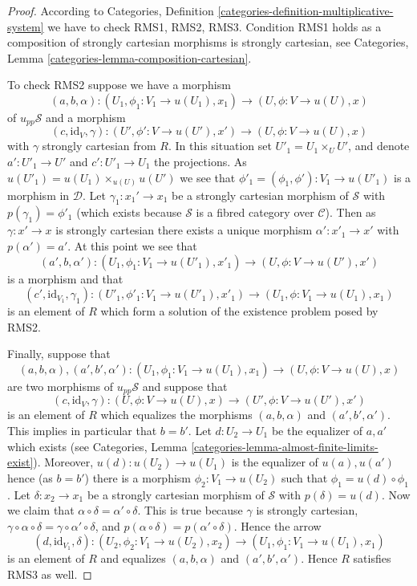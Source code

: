 \begin{proof}
According to
Categories, Definition \ref{categories-definition-multiplicative-system}
we have to check RMS1, RMS2, RMS3.
Condition RMS1 holds as a composition of strongly cartesian morphisms is 
strongly cartesian, see
Categories, Lemma \ref{categories-lemma-composition-cartesian}.

\medskip\noindent
To check RMS2 suppose we have a morphism
$$
(a, b, \alpha) :
(U_1, \phi_1 : V_1 \to u(U_1), x_1)
\longrightarrow
(U, \phi : V \to u(U), x)
$$
of $u_{pp}\mathcal{S}$ and a morphism
$$
(c, \text{id}_V, \gamma) :
(U', \phi' : V \to u(U'), x')
\longrightarrow
(U, \phi : V \to u(U), x)
$$
with $\gamma$ strongly cartesian from $R$. In this situation set
$U'_1 = U_1 \times_U U'$, and denote $a' : U'_1 \to U'$ and
$c' : U'_1 \to U_1$ the projections.
As $u(U'_1) = u(U_1) \times_{u(U)} u(U')$
we see that $\phi'_1 = (\phi_1, \phi') : V_1 \to u(U'_1)$ is
a morphism in $\mathcal{D}$. Let $\gamma_1 : x_1' \to x_1$
be a strongly cartesian morphism of $\mathcal{S}$ with
$p(\gamma_1) = \phi'_1$ (which exists because $\mathcal{S}$ is a
fibred category over $\mathcal{C}$). Then as $\gamma : x' \to x$ is
strongly cartesian there exists a unique morphism
$\alpha' : x'_1 \to x'$ with $p(\alpha') = a'$.
At this point we see that
$$
(a', b, \alpha') :
(U_1, \phi_1 : V_1 \to u(U'_1), x'_1)
\longrightarrow
(U, \phi : V \to u(U'), x')
$$
is a morphism and that
$$
(c', \text{id}_{V_1}, \gamma_1) :
(U'_1, \phi'_1 : V_1 \to u(U'_1), x'_1)
\longrightarrow
(U_1, \phi : V_1 \to u(U_1), x_1)
$$
is an element of $R$ which form a solution of the existence problem
posed by RMS2.

\medskip\noindent
Finally, suppose that
$$
(a, b, \alpha), (a', b', \alpha') :
(U_1, \phi_1 : V_1 \to u(U_1), x_1)
\longrightarrow
(U, \phi : V \to u(U), x)
$$
are two morphisms of $u_{pp}\mathcal{S}$ and suppose that
$$
(c, \text{id}_V, \gamma) :
(U, \phi : V \to u(U), x)
\longrightarrow
(U', \phi : V \to u(U'), x')
$$
is an element of $R$ which equalizes the morphisms
$(a, b, \alpha)$ and $(a', b', \alpha')$. This implies in particular
that $b = b'$. Let $d : U_2 \to U_1$ be the equalizer of $a, a'$ which
exists (see
Categories, Lemma \ref{categories-lemma-almost-finite-limits-exist}).
Moreover, $u(d) : u(U_2) \to u(U_1)$ is the equalizer of $u(a), u(a')$
hence (as $b = b'$) there is a morphism $\phi_2 : V_1 \to u(U_2)$ such that
$\phi_1 = u(d) \circ \phi_1$. Let $\delta : x_2 \to x_1$ be a strongly
cartesian morphism of $\mathcal{S}$ with $p(\delta) = u(d)$.
Now we claim that $\alpha \circ \delta = \alpha' \circ \delta$.
This is true because
$\gamma$ is strongly cartesian,
$\gamma \circ \alpha \circ \delta = \gamma \circ \alpha' \circ \delta$, and
$p(\alpha \circ \delta) = p(\alpha' \circ \delta)$.
Hence the arrow
$$
(d, \text{id}_{V_1}, \delta) :
(U_2, \phi_2 : V_1 \to u(U_2), x_2)
\longrightarrow
(U_1, \phi_1 : V_1 \to u(U_1), x_1)
$$
is an element of $R$ and equalizes $(a, b, \alpha)$ and $(a', b', \alpha')$.
Hence $R$ satisfies RMS3 as well.
\end{proof}

